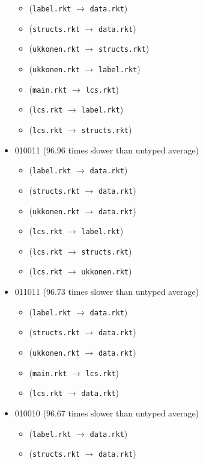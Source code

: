 \documentclass{article}
\newcommand{\mono}[1]{\texttt{#1}}
\begin{document}
\begin{itemize}
  \begin{itemize}
  \item (\mono{label.rkt} $\rightarrow$ \mono{data.rkt})
  \item (\mono{structs.rkt} $\rightarrow$ \mono{data.rkt})
  \item (\mono{ukkonen.rkt} $\rightarrow$ \mono{structs.rkt})
  \item (\mono{ukkonen.rkt} $\rightarrow$ \mono{label.rkt})
  \item (\mono{main.rkt} $\rightarrow$ \mono{lcs.rkt})
  \item (\mono{lcs.rkt} $\rightarrow$ \mono{label.rkt})
  \item (\mono{lcs.rkt} $\rightarrow$ \mono{structs.rkt})
  \end{itemize}
\item 010011 (96.96 times slower than untyped average)
  \begin{itemize}
  \item (\mono{label.rkt} $\rightarrow$ \mono{data.rkt})
  \item (\mono{structs.rkt} $\rightarrow$ \mono{data.rkt})
  \item (\mono{ukkonen.rkt} $\rightarrow$ \mono{data.rkt})
  \item (\mono{lcs.rkt} $\rightarrow$ \mono{label.rkt})
  \item (\mono{lcs.rkt} $\rightarrow$ \mono{structs.rkt})
  \item (\mono{lcs.rkt} $\rightarrow$ \mono{ukkonen.rkt})
  \end{itemize}
\item 011011 (96.73 times slower than untyped average)
  \begin{itemize}
  \item (\mono{label.rkt} $\rightarrow$ \mono{data.rkt})
  \item (\mono{structs.rkt} $\rightarrow$ \mono{data.rkt})
  \item (\mono{ukkonen.rkt} $\rightarrow$ \mono{data.rkt})
  \item (\mono{main.rkt} $\rightarrow$ \mono{lcs.rkt})
  \item (\mono{lcs.rkt} $\rightarrow$ \mono{data.rkt})
  \end{itemize}
\item 010010 (96.67 times slower than untyped average)
  \begin{itemize}
  \item (\mono{label.rkt} $\rightarrow$ \mono{data.rkt})
  \item (\mono{structs.rkt} $\rightarrow$ \mono{data.rkt})

\end{itemize}
\end{itemize}
\end{document}

